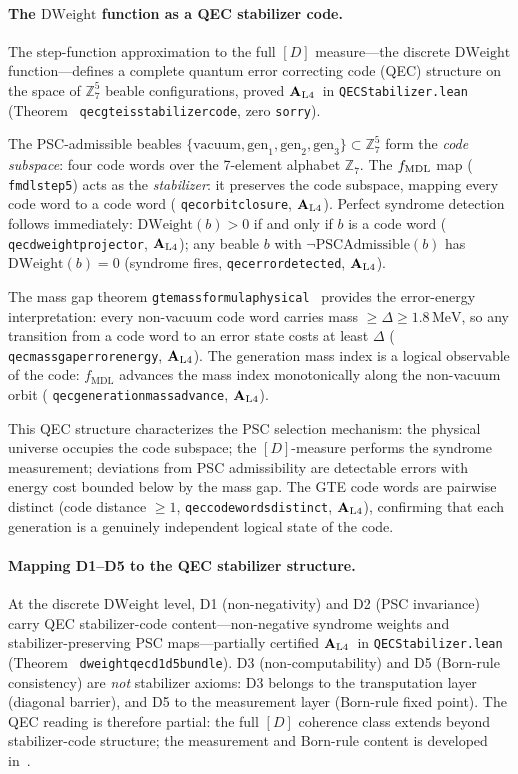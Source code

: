 \documentclass[12pt,letterpaper]{article}
\newcommand{\fmdl}{f_{\mathrm{MDL}}}
\newcommand{\Zseven}{\mathbb{Z}_7}
\newcommand{\Dclass}{[D]}
\newcommand{\catAL}{\ensuremath{\textbf{A}_{\rm L4}}}
\newcommand{\lean}[1]{%
  \penalty-100
  \begingroup\def\_{\textunderscore\allowbreak}\texttt{#1}\endgroup}
\begin{document}
\paragraph{The $\mathrm{DWeight}$ function as a QEC stabilizer code.}
The step-function approximation to the full $\Dclass$ measure---the discrete
$\mathrm{DWeight}$ function---defines a complete quantum error correcting code (QEC)
structure on the space of $\Zseven^5$ beable configurations, proved \catAL\ in
\lean{QECStabilizer.lean} (Theorem~\lean{qec\_gte\_is\_stabilizer\_code}, zero \texttt{sorry}).

The PSC-admissible beables $\{\mathrm{vacuum}, \mathrm{gen}_1, \mathrm{gen}_2,
\mathrm{gen}_3\} \subset \Zseven^5$ form the \emph{code subspace}: four code words
over the 7-element alphabet $\Zseven$.  The $f_{\rm MDL}$ map (\lean{fmdl\_step5})
acts as the \emph{stabilizer}: it preserves the code subspace, mapping every code
word to a code word (\lean{qec\_orbit\_closure}, \catAL).  Perfect syndrome
detection follows immediately: $\mathrm{DWeight}(b) > 0$ if and only if $b$ is a code
word (\lean{qec\_dweight\_projector}, \catAL); any beable $b$ with
$\neg\mathrm{PSCAdmissible}(b)$ has $\mathrm{DWeight}(b) = 0$ (syndrome fires,
\lean{qec\_error\_detected}, \catAL).

The mass gap theorem \lean{gte\_mass\_formula\_physical}~\cite{SpivackEmergentGravity}
provides the error-energy interpretation: every non-vacuum code word carries mass
$\geq \Delta \geq 1.8\,\mathrm{MeV}$, so any transition from a code word to an
error state costs at least $\Delta$ (\lean{qec\_mass\_gap\_error\_energy}, \catAL).
The generation mass index is a logical observable of the code: $\fmdl$ advances the
mass index monotonically along the non-vacuum orbit
(\lean{qec\_generation\_mass\_advance}, \catAL).

This QEC structure characterizes the PSC selection mechanism: the physical universe
occupies the code subspace; the $\Dclass$-measure performs the syndrome measurement;
deviations from PSC admissibility are detectable errors with energy cost bounded below
by the mass gap.  The GTE code words are pairwise distinct (code distance $\geq 1$,
\lean{qec\_code\_words\_distinct}, \catAL), confirming that each generation is a
genuinely independent logical state of the code.

\paragraph{Mapping D1--D5 to the QEC stabilizer structure.}
At the discrete $\mathrm{DWeight}$ level, D1 (non-negativity) and D2 (PSC invariance)
carry QEC stabilizer-code content---non-negative syndrome weights and
stabilizer-preserving PSC maps---partially certified \catAL\ in
\lean{QECStabilizer.lean} (Theorem~\lean{dweight\_qec\_d1\_d5\_bundle}).
D3 (non-computability) and D5 (Born-rule consistency) are \emph{not} stabilizer axioms:
D3 belongs to the transputation layer (diagonal barrier), and D5 to the measurement layer
(Born-rule fixed point).
The QEC reading is therefore partial: the full $[D]$ coherence class extends beyond
stabilizer-code structure; the measurement and Born-rule content is developed
in~\cite{SpivackQMFromR110}.
\end{document}

